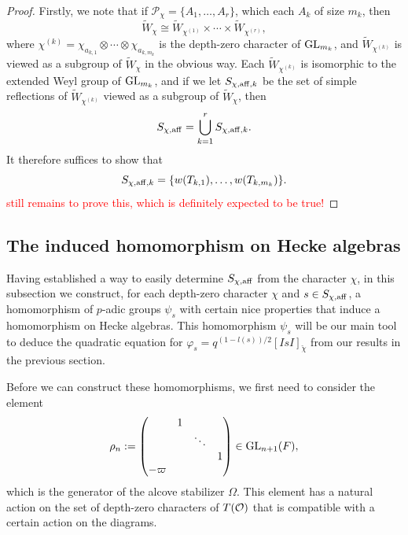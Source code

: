     \begin{proof}
        Firstly, we note that if $\mathcal{P}_\chi=\{A_1,\ldots,A_r\}$, which each $A_k$ of size $m_k$, then 
        $$\widetilde{W}_\chi\cong \widetilde{W}_{\chi^{(1)}}\times\cdots\times\widetilde{W}_{\chi^{(r)}},$$
        where $\chi^{(k)}=\chi_{a_{k,1}}\otimes\cdots\otimes\chi_{a_{k,m_k}}$ is the depth-zero character of $\mathrm{GL}_{m_k}$, and $\widetilde{W}_{\chi^{(k)}}$ is viewed as a subgroup of $\widetilde{W}_{\chi}$ in the obvious way. Each $\widetilde{W}_{\chi^{(k)}}$ is isomorphic to the extended Weyl group of $\mathrm{GL}_{m_k}$, and if we let $S_{\chi,\mathrm{aff},k}$ be the set of simple reflections of $\widetilde{W}_{\chi^{(k)}}$ viewed as a subgroup of $\widetilde{W}_{\chi}$, then 
        $$S_{\chi,\mathrm{aff}}=\bigcup_{k=1}^r S_{\chi,\mathrm{aff},k}.$$
        It therefore suffices to show that 
        $$S_{\chi,\mathrm{aff},k}=\{w(T_{k,1}),\ldots,w(T_{k,m_k})\}.$$
        \textcolor{red}{still remains to prove this, which is definitely expected to be true!}
    \end{proof}
        
    \subsection{The induced homomorphism on Hecke algebras}

    Having established a way to easily determine $S_{\chi,\mathrm{aff}}$ from the character $\chi$, in this subsection we construct, for each depth-zero character $\chi$ and $s\in S_{\chi,\mathrm{aff}}$, a homomorphism of $p$-adic groups $\psi_s$ with certain nice properties that induce a homomorphism on Hecke algebras. This homomorphism $\psi_s$ will be our main tool to deduce the quadratic equation for $\varphi_s=q^{(1-l(s))/2}[IsI]_{\check{\chi}}$ from our results in the previous section.

    Before we can construct these homomorphisms, we first need to consider the element
    \begin{equation*}
        \rho_n:=
        \begin{pmatrix}
            &1&& \\
            &&\ddots& \\
            &&&1 \\
            -\varpi&&& 
        \end{pmatrix}
        \in\mathrm{GL}_{n+1}(F),
    \end{equation*}
    which is the generator of the alcove stabilizer $\Omega$. This element has a natural action on the set of depth-zero characters of $T(\mathcal{O})$ that is compatible with a certain action on the diagrams.


